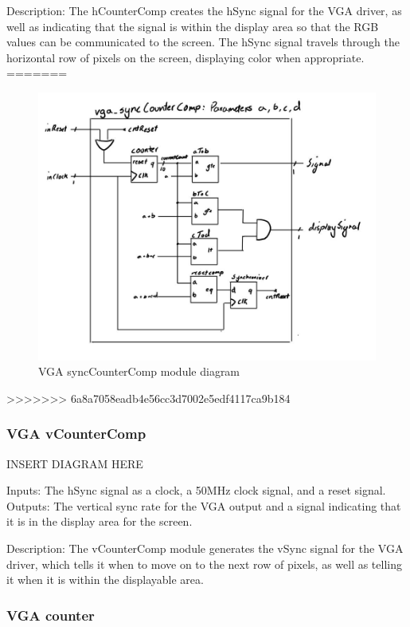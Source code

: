 \documentclass[a4paper]{article}
\begin{document}
Description: The hCounterComp creates the hSync signal for the VGA driver, as well as indicating that the signal is within the display area so that the RGB values can be communicated to the screen. The hSync signal travels through the horizontal row of pixels on the screen, displaying color when appropriate.
=======
\begin{figure}[H]
    \includegraphics[width=0.8 \linewidth]{images/vga_syncCounterComp.JPG}
    \caption{VGA syncCounterComp module diagram}
    \label{vgaSyncCounterCompDiagram}
\end{figure}
>>>>>>> 6a8a7058eadb4e56cc3d7002e5edf4117ca9b184

\subsubsection{VGA vCounterComp}

INSERT DIAGRAM HERE

Inputs: The hSync signal as a clock, a 50MHz clock signal, and a reset signal.
Outputs: The vertical sync rate for the VGA output and a signal indicating that it is in the display area for the screen.

Description: The vCounterComp module generates the vSync signal for the VGA driver, which tells it when to move on to the next row of pixels, as well as telling it when it is within the displayable area.

\subsubsection{VGA counter}
\end{document}
